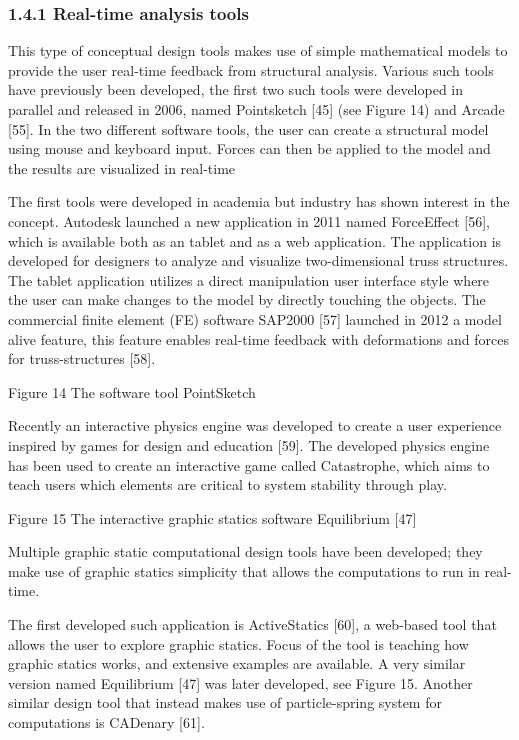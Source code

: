 \subsubsection[1.4.1 Real{}-time analysis tools]{1.4.1 Real-time analysis tools}
This type of conceptual design tools makes use of simple mathematical models to provide the user real-time feedback from structural analysis. Various such tools have previously been developed, the first two such tools were developed in parallel and released in 2006, named Pointsketch [45] (see Figure 14) and Arcade [55]. In the two different software tools, the user can create a structural model using mouse and keyboard input. Forces can then be applied to the model and the results are visualized in real-time 



The first tools were developed in academia but industry has shown interest in the concept. Autodesk launched a new application in 2011 named ForceEffect [56], which is available both as an tablet and as a web application. The application is developed for designers to analyze and visualize two-dimensional truss structures. The tablet application utilizes a direct manipulation user interface style where the user can make changes to the model by directly touching the objects. The commercial finite element (FE) software SAP2000 [57] launched in 2012 a model alive feature, this feature enables real-time feedback with deformations and forces for truss-structures [58].


Figure 14 The software tool PointSketch

Recently an interactive physics engine was developed to create a user experience inspired by games for design and education [59]. The developed physics engine has been used to create an interactive game called Catastrophe, which aims to teach users which elements are critical to system stability through play.


Figure 15 The interactive graphic statics software Equilibrium [47] 

Multiple graphic static computational design tools have been developed; they make use of graphic statics simplicity that allows the computations to run in real-time.



The first developed such application is ActiveStatics [60], a web-based tool that allows the user to explore graphic statics. Focus of the tool is teaching how graphic statics works, and extensive examples are available. A very similar version named Equilibrium [47] was later developed, see Figure 15. Another similar design tool that instead makes use of particle-spring system for computations is CADenary [61].


